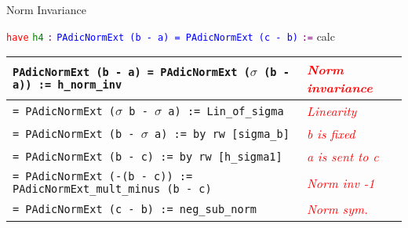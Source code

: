 \documentclass{beamer}
\begin{document}
\begin{frame}{Norm Invariance}

\scriptsize
\textcolor{red}{\texttt{have}} \textcolor{green}{\texttt{h4}} \textcolor{purple}{\texttt{:}} \textcolor{blue}{\texttt{PAdicNormExt (b - a) = PAdicNormExt (c - b)}} \textcolor{purple}{\texttt{:=}} calc

\vspace{1em}

\begin{center}
\begin{tabular}{|m{}|>{\centering\arraybackslash}m{}|}
\hline
\texttt{PAdicNormExt (b - a) = PAdicNormExt (}$\sigma$\texttt{ (b - a)) := h\_norm\_inv} &
\textit{\textcolor{red}{Norm invariance}} \\
\hline
\texttt{= PAdicNormExt (}$\sigma$\texttt{ b - }$\sigma$\texttt{ a) := Lin\_of\_sigma} &
\textit{\textcolor{red}{Linearity}} \\
\hline
\texttt{= PAdicNormExt (b - }$\sigma$\texttt{ a) := by rw [sigma\_b]} &
\textit{\textcolor{red}{b is fixed}} \\
\hline
\texttt{= PAdicNormExt (b - c) := by rw [h\_sigma1]} &
\textit{\textcolor{red}{a is sent to c}} \\
\hline
\texttt{= PAdicNormExt (-(b - c)) := PAdicNormExt\_mult\_minus (b - c)} &
\textit{\textcolor{red}{Norm inv -1}} \\
\hline
\texttt{= PAdicNormExt (c - b) := neg\_sub\_norm} &
\textit{\textcolor{red}{Norm sym.}} \\
\hline
\end{tabular}
\end{center}

\end{frame}
\end{document}
